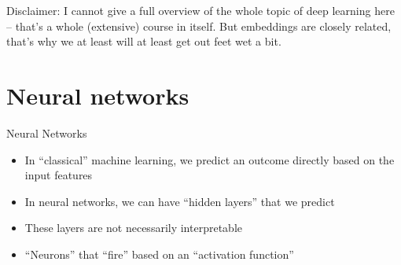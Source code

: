 \documentclass[compress]{beamer}
\begin{document}
\begin{frame}[standout]
	Disclaimer: I cannot give a full overview of the whole topic of deep learning here -- that's a whole (extensive) course in itself. But embeddings are closely related, that's why we at least will at least get out feet wet a bit.
\end{frame}



\section{Neural networks}


\begin{frame}{Neural Networks}
	\begin{itemize}
		\item In ``classical'' machine learning, we predict an outcome directly based on the input features
		\item In neural networks, we can have ``hidden layers'' that we predict
		\item These layers are not necessarily interpretable
		\item ``Neurons'' that ``fire'' based on an ``activation function''
	\end{itemize}
	
\end{frame}
\end{document}
